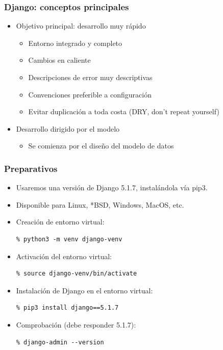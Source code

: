 \begin{frame}
\frametitle{Django: conceptos principales}

\begin{itemize}
\item Objetivo principal: desarrollo muy rápido
  \begin{itemize}
  \item Entorno integrado y completo
  \item Cambios en caliente
  \item Descripciones de error muy descriptivas
  \item Convenciones preferible a configuración
  \item Evitar duplicación a toda costa (DRY, don't repeat yourself)
  \end{itemize}
\item Desarrollo dirigido por el modelo
  \begin{itemize}
  \item Se comienza por el diseño del modelo de datos
  \end{itemize}
\end{itemize}

\end{frame}


\begin{frame}[fragile]
\frametitle{Preparativos}

\begin{itemize}
\item Usaremos una versión de Django 5.1.7, instalándola vía pip3.
\item Disponible para Linux, *BSD, Windows, MacOS, etc.
\item Creación de entorno virtual:

\begin{verbatim}
% python3 -m venv django-venv    
\end{verbatim}

\item Activación del entorno virtual:

\begin{verbatim}
% source django-venv/bin/activate
\end{verbatim}

\item Instalación de Django en el entorno virtual:

\begin{verbatim}
% pip3 install django==5.1.7
\end{verbatim}

\item Comprobación (debe responder 5.1.7):
\begin{verbatim}
% django-admin --version
\end{verbatim}
\end{itemize}


\end{frame}


